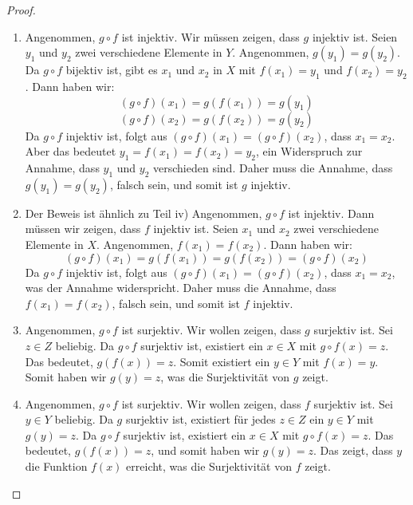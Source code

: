 \documentclass{../problemset}
\begin{document}
\begin{problem}
\begin{proof}
\begin{enumerate}
		\item Angenommen, $g \circ f$ ist injektiv. Wir müssen zeigen, dass $g$ injektiv ist.
		      Seien $y_1$ und $y_2$ zwei verschiedene Elemente in $Y$. Angenommen, $g(y_1) = g(y_2)$.
		      Da $g \circ f$ bijektiv ist, gibt es $x_1$ und $x_2$ in $X$ mit $f(x_1) = y_1$ und $f(x_2) = y_2$. Dann haben wir:
		      \[(g \circ f)(x_1) = g(f(x_1)) = g(y_1)\]
		      \[(g \circ f)(x_2) = g(f(x_2)) = g(y_2)\]
		      Da $g \circ f$ injektiv ist, folgt aus $(g \circ f)(x_1) = (g \circ f)(x_2)$, dass $x_1 = x_2$.
		      Aber das bedeutet $y_1 = f(x_1) = f(x_2) = y_2$, ein Widerspruch zur Annahme, dass $y_1$ und $y_2$ verschieden sind. Daher muss die Annahme, dass $g(y_1) = g(y_2)$, falsch sein, und somit ist $g$ injektiv. \checkmark
		\item Der Beweis ist ähnlich zu Teil iv) Angenommen, $g \circ f$ ist injektiv.
		      Dann müssen wir zeigen, dass $f$ injektiv ist. Seien $x_1$ und $x_2$ zwei verschiedene Elemente in $X$. Angenommen, $f(x_1) = f(x_2)$. Dann haben wir:
		      \[(g \circ f)(x_1) = g(f(x_1)) = g(f(x_2)) = (g \circ f)(x_2)\]
		      Da $g \circ f$ injektiv ist, folgt aus $(g \circ f)(x_1) = (g \circ f)(x_2)$, dass $x_1 = x_2$, was der Annahme widerspricht. Daher muss die Annahme, dass $f(x_1) = f(x_2)$, falsch sein, und somit ist $f$ injektiv. \checkmark
		\item Angenommen, $g \circ f$ ist surjektiv. Wir wollen zeigen, dass $g$ surjektiv ist.
		      Sei $z \in Z$ beliebig. Da $g \circ f$ surjektiv ist, existiert ein $x \in X$ mit $g \circ f(x) = z$.
		      Das bedeutet, $g(f(x)) = z$. Somit existiert ein $y \in Y$ mit $f(x) = y$.
		      Somit haben wir $g(y) = z$, was die Surjektivität von $g$ zeigt. \checkmark
		\item Angenommen, $g \circ f$ ist surjektiv. Wir wollen zeigen, dass $f$ surjektiv ist.
		      Sei $y \in Y$ beliebig. Da $g$ surjektiv ist, existiert für jedes $z \in Z$ ein $y \in Y$ mit $g(y) = z$.
		      Da $g \circ f$ surjektiv ist, existiert ein $x \in X$ mit $g \circ f(x) = z$.
		      Das bedeutet, $g(f(x)) = z$, und somit haben wir $g(y) = z$.
		      Das zeigt, dass $y$ die Funktion $f(x)$ erreicht, was die Surjektivität von $f$ zeigt. \checkmark
	\end{enumerate}
\end{proof}
\end{problem}

\pagebreak
\end{document}
